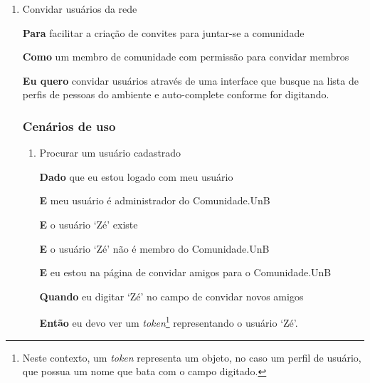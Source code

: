 \begin{enumerate}

\item Convidar usuários da rede

	\textbf{Para} facilitar a criação de convites para juntar-se a comunidade

	\textbf{Como} um membro de comunidade com permissão para convidar membros

	\textbf{Eu quero} convidar usuários através de uma interface que busque na lista
	de perfis de pessoas do ambiente e auto-complete conforme for digitando.

\subsubsection*{Cenários de uso}

	\begin{enumerate}

		\item Procurar um usuário cadastrado

		\textbf{Dado} que eu estou logado com meu usuário

		\textbf{E} meu usuário é administrador do Comunidade.UnB

		\textbf{E} o usuário `Zé' existe

		\textbf{E} o usuário `Zé' não é membro do Comunidade.UnB

		\textbf{E} eu estou na página de convidar amigos para o Comunidade.UnB

		\textbf{Quando} eu digitar `Zé' no campo de convidar novos amigos

		\textbf{Então} eu devo ver um \textit{token}\footnote{Neste contexto, um
		\textit{token} representa um objeto, no caso um perfil de usuário, que possua
		um nome que bata com o campo digitado.} representando o usuário `Zé'.

	\end{enumerate}


\end{enumerate}	



